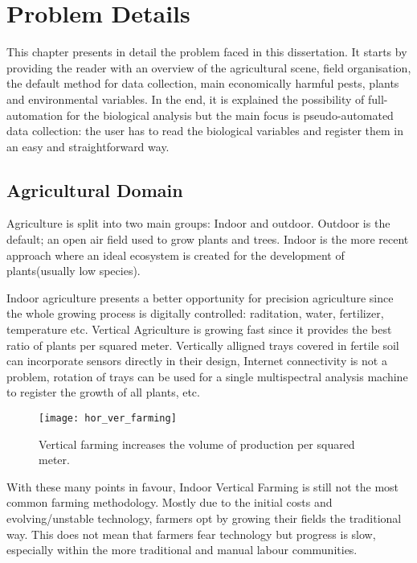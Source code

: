 \chapter{Problem Details}
\label{cha:problem}

This chapter presents in detail the problem faced in this dissertation. It starts by providing the reader with an overview of the agricultural scene, field organisation, the default method for data collection, main economically harmful pests, plants and environmental variables. In the end, it is explained the possibility of full-automation for the biological analysis but the main focus is pseudo-automated data collection: the user has to read the biological variables and register them in an easy and straightforward way.

\section{Agricultural Domain} %
\label{sec:agricultural_domain}

Agriculture is split into two main groups: Indoor and outdoor. Outdoor is the default; an open air field used to grow plants and trees. Indoor is the more recent approach where an ideal ecosystem is created for the development of plants(usually low species).

Indoor agriculture presents a better opportunity for precision agriculture since the whole growing process is digitally controlled: raditation, water, fertilizer, temperature etc. Vertical Agriculture is growing fast since it provides the best ratio of plants per squared meter. Vertically alligned trays covered in fertile soil can incorporate sensors directly in their design, Internet connectivity is not a problem, rotation of trays can be used for a single multispectral analysis machine to register the growth of all plants, etc. 

\begin{figure}[htbp]
  \centering
  \texttt{[image: hor\_ver\_farming]}
  \caption{Vertical farming increases the volume of production per squared meter.}
  \label{fig:horizontal_vertical_farming}
\end{figure}

With these many points in favour, Indoor Vertical Farming is still not the most common farming methodology. Mostly due to the initial costs and evolving/unstable technology, farmers opt by growing their fields the traditional way. This does not mean that farmers fear technology but progress is slow, especially within the more traditional and manual labour communities. 

